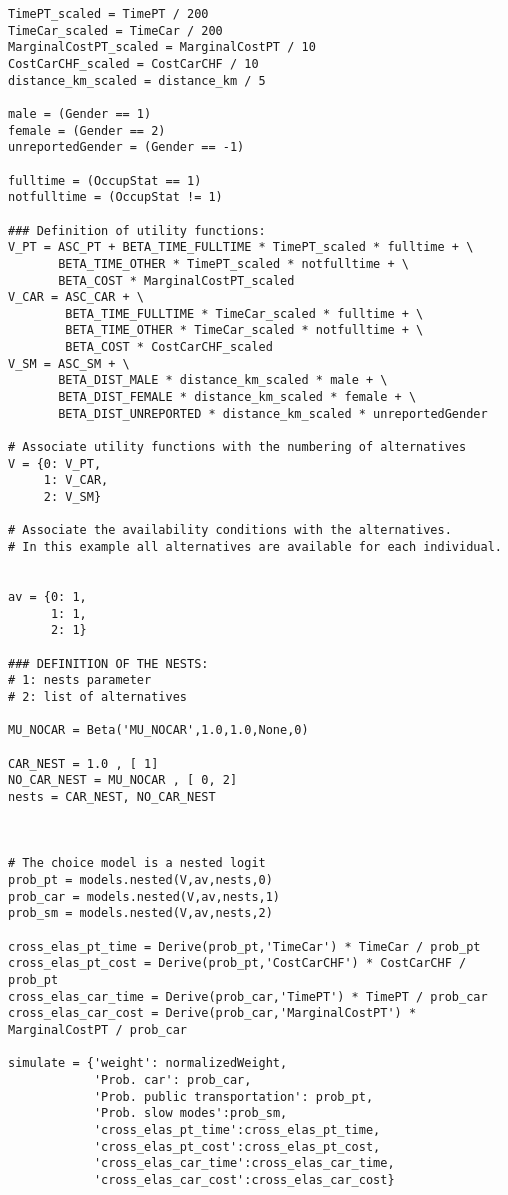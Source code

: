\documentclass[12pt,a4paper]{article}
\begin{document}
\begin{lstlisting}[style=numbers]
TimePT_scaled = TimePT / 200
TimeCar_scaled = TimeCar / 200
MarginalCostPT_scaled = MarginalCostPT / 10
CostCarCHF_scaled = CostCarCHF / 10
distance_km_scaled = distance_km / 5

male = (Gender == 1)
female = (Gender == 2)
unreportedGender = (Gender == -1)

fulltime = (OccupStat == 1)
notfulltime = (OccupStat != 1)

### Definition of utility functions:
V_PT = ASC_PT + BETA_TIME_FULLTIME * TimePT_scaled * fulltime + \
       BETA_TIME_OTHER * TimePT_scaled * notfulltime + \
       BETA_COST * MarginalCostPT_scaled
V_CAR = ASC_CAR + \
        BETA_TIME_FULLTIME * TimeCar_scaled * fulltime + \
        BETA_TIME_OTHER * TimeCar_scaled * notfulltime + \
        BETA_COST * CostCarCHF_scaled
V_SM = ASC_SM + \
       BETA_DIST_MALE * distance_km_scaled * male + \
       BETA_DIST_FEMALE * distance_km_scaled * female + \
       BETA_DIST_UNREPORTED * distance_km_scaled * unreportedGender

# Associate utility functions with the numbering of alternatives
V = {0: V_PT,
     1: V_CAR,
     2: V_SM}

# Associate the availability conditions with the alternatives.
# In this example all alternatives are available for each individual.


av = {0: 1,
      1: 1,
      2: 1}

### DEFINITION OF THE NESTS:
# 1: nests parameter
# 2: list of alternatives

MU_NOCAR = Beta('MU_NOCAR',1.0,1.0,None,0)

CAR_NEST = 1.0 , [ 1]
NO_CAR_NEST = MU_NOCAR , [ 0, 2]
nests = CAR_NEST, NO_CAR_NEST



# The choice model is a nested logit
prob_pt = models.nested(V,av,nests,0)
prob_car = models.nested(V,av,nests,1)
prob_sm = models.nested(V,av,nests,2)

cross_elas_pt_time = Derive(prob_pt,'TimeCar') * TimeCar / prob_pt 
cross_elas_pt_cost = Derive(prob_pt,'CostCarCHF') * CostCarCHF / prob_pt 
cross_elas_car_time = Derive(prob_car,'TimePT') * TimePT / prob_car 
cross_elas_car_cost = Derive(prob_car,'MarginalCostPT') * MarginalCostPT / prob_car 

simulate = {'weight': normalizedWeight,
            'Prob. car': prob_car,
            'Prob. public transportation': prob_pt,
            'Prob. slow modes':prob_sm,
            'cross_elas_pt_time':cross_elas_pt_time,
            'cross_elas_pt_cost':cross_elas_pt_cost,
            'cross_elas_car_time':cross_elas_car_time,
            'cross_elas_car_cost':cross_elas_car_cost}


\end{lstlisting}
\end{document}
